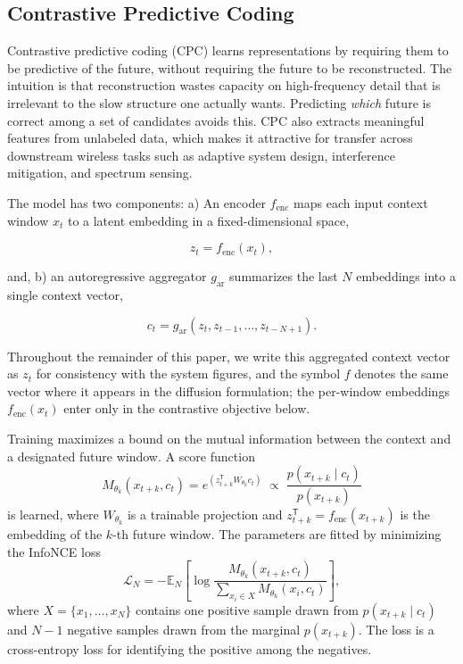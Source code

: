 \documentclass[lettersize,journal]{IEEEtran}
\begin{document}
\subsection{\textbf{Contrastive Predictive Coding}}
Contrastive predictive coding (CPC) \cite{Oord2018} learns
representations by requiring them to be predictive of the future, without
requiring the future to be reconstructed. The intuition is that
reconstruction wastes capacity on high-frequency detail that is
irrelevant to the slow structure one actually wants. Predicting
\emph{which} future is correct among a set of candidates avoids this.
CPC also extracts meaningful features from unlabeled data, which makes it
attractive for transfer across downstream wireless tasks such as adaptive
system design, interference mitigation, and spectrum sensing.

The model has two components: a) An encoder $f_{\mathrm{enc}}$ maps each
input context window $x_t$ to a latent embedding in a fixed-dimensional
space,

\begin{equation}
z_t = f_{\mathrm{enc}}(x_t),
\end{equation}

and, b) an autoregressive aggregator $g_{\mathrm{ar}}$ summarizes the last
$N$ embeddings into a single context vector,

\begin{equation}
c_t = g_{\mathrm{ar}}(z_t, z_{t-1}, \ldots, z_{t-N+1}).
\end{equation}

Throughout the remainder of this paper, we write this aggregated context
vector as $z_t$ for consistency with the system figures, and the symbol
$f$ denotes the same vector where it appears in the diffusion
formulation; the per-window embeddings $f_{\mathrm{enc}}(x_t)$ enter only
in the contrastive objective below.

Training maximizes a bound on the mutual information between the context
and a designated future window. A score function
\begin{equation}
M_{\theta_k}(x_{t+k}, c_t)
 = e^{\left(z_{t+k}^{\mathsf{T}} W_{\theta_k} c_t\right)}
 \;\propto\; \frac{p(x_{t+k} \mid c_t)}{p(x_{t+k})}
\label{eq:density_ratio}
\end{equation}
is learned, where $W_{\theta_k}$ is a trainable projection and
$z_{t+k}^{\mathsf{T}} = f_{\mathrm{enc}}(x_{t+k})$ is the embedding of
the $k$-th future window. The parameters are fitted by minimizing the
InfoNCE loss
\begin{equation}
\mathcal{L}_N = -\mathbb{E}_N\!\left[
\log \frac{M_{\theta_k}(x_{t+k}, c_t)}
{\sum_{x_i \in X} M_{\theta_k}(x_i, c_t)}\right],
\label{eq:infonce}
\end{equation}
where $X = \{x_1, \ldots, x_N\}$ contains one positive sample drawn from
$p(x_{t+k} \mid c_t)$ and $N-1$ negative samples drawn from the marginal
$p(x_{t+k})$.
The loss is a cross-entropy loss for identifying the positive
among the negatives.
\end{document}
